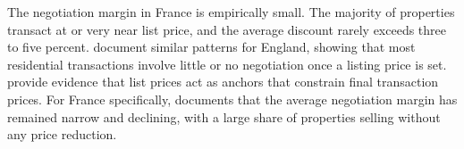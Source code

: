 The negotiation margin in France is empirically small. The majority of properties transact at or very near list price, and the average discount rarely exceeds three to five percent. \citet{merlo_bargaining_2004} document similar patterns for England, showing that most residential transactions involve little or no negotiation once a listing price is set. \citet{genesove_loss_2001} provide evidence that list prices act as anchors that constrain final transaction prices. For France specifically, \citet{friggit_marche_2013} documents that the average negotiation margin has remained narrow and declining, with a large share of properties selling without any price reduction.